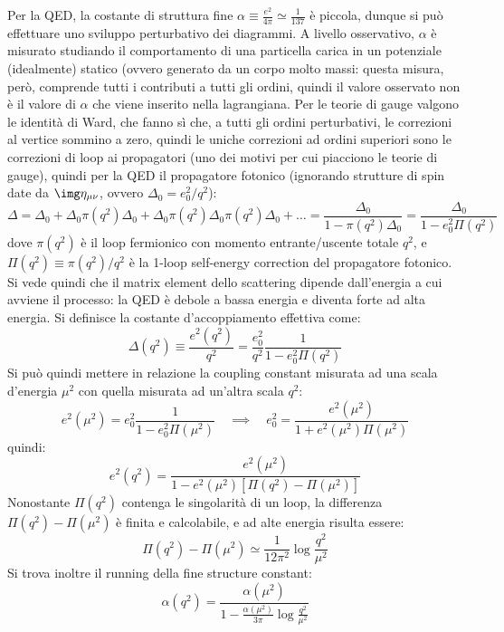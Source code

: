 Per la QED, la costante di struttura fine $ \alpha \equiv \frac{e^2}{4\pi} \simeq \frac{1}{137} $ è piccola, dunque si può effettuare uno sviluppo perturbativo dei diagrammi. A livello osservativo, $ \alpha $ è misurato studiando il comportamento di una particella carica in un potenziale (idealmente) statico (ovvero generato da un corpo molto massi: questa misura, però, comprende tutti i contributi a tutti gli ordini, quindi il valore osservato non è il valore di $ \alpha $ che viene inserito nella lagrangiana. Per le teorie di gauge valgono le identità di Ward, che fanno sì che, a tutti gli ordini perturbativi, le correzioni al vertice sommino a zero, quindi le uniche correzioni ad ordini superiori sono le correzioni di loop ai propagatori (uno dei motivi per cui piacciono le teorie di gauge), quindi per la QED il propagatore fotonico (ignorando strutture di spin date da $ \img \eta_{\mu \nu} $, ovvero $ \Delta_0 = e_0^2 / q^2 $):
\begin{equation*}
  \Delta = \Delta_0 + \Delta_0 \pi(q^2) \Delta_0 + \Delta_0 \pi(q^2) \Delta_0 \pi(q^2) \Delta_0 + \dots = \frac{\Delta_0}{1 - \pi(q^2) \Delta_0} = \frac{\Delta_0}{1 - e_0^2 \Pi(q^2)}
\end{equation*}
dove $ \pi(q^2) $ è il loop fermionico con momento entrante/uscente totale $ q^2 $, e $ \Pi(q^2) \equiv \pi(q^2) / q^2 $ è la 1-loop self-energy correction del propagatore fotonico. Si vede quindi che il matrix element dello scattering dipende dall'energia a cui avviene il processo: la QED è debole a bassa energia e diventa forte ad alta energia. Si definisce la costante d'accoppiamento effettiva come:
\begin{equation*}
  \Delta(q^2) \equiv \frac{e^2(q^2)}{q^2} = \frac{e_0^2}{q^2} \frac{1}{1 - e_0^2 \Pi(q^2)}
\end{equation*}
Si può quindi mettere in relazione la coupling constant misurata ad una scala d'energia $ \mu^2 $ con quella misurata ad un'altra scala $ q^2 $:
\begin{equation*}
  e^2(\mu^2) = e_0^2 \frac{1}{1 - e_0^2 \Pi(\mu^2)}
  \quad \implies \quad
  e_0^2 = \frac{e^2(\mu^2)}{1 + e^2(\mu^2) \Pi(\mu^2)}
\end{equation*}
quindi:
\begin{equation*}
  e^2(q^2) = \frac{e^2(\mu^2)}{1 - e^2(\mu^2) [ \Pi(q^2) - \Pi(\mu^2) ]}
\end{equation*}
Nonostante $ \Pi(q^2) $ contenga le singolarità di un loop, la differenza $ \Pi(q^2) - \Pi(\mu^2) $ è finita e calcolabile, e ad alte energia risulta essere:
\begin{equation*}
  \Pi(q^2) - \Pi(\mu^2) \simeq \frac{1}{12\pi^2} \log \frac{q^2}{\mu^2}
\end{equation*}
Si trova inoltre il running della fine structure constant:
\begin{equation*}
  \alpha(q^2) = \frac{\alpha(\mu^2)}{1 - \frac{\alpha(\mu^2)}{3\pi} \log \frac{q^2}{\mu^2}}
\end{equation*}

